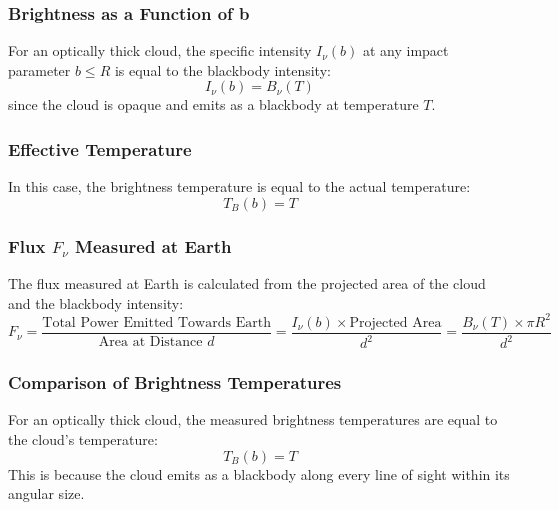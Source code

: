 \documentclass[12pt]{article}
\begin{document}
\subsubsection{Brightness as a Function of b}

For an optically thick cloud, the specific intensity \( I_\nu(b) \) at any impact parameter \( b \leq R \) is equal to the blackbody intensity:
\[
    I_\nu(b) = B_\nu(T)
\]
since the cloud is opaque and emits as a blackbody at temperature \( T \).

\subsubsection{Effective Temperature}

In this case, the brightness temperature is equal to the actual temperature:
\[
    T_B(b) = T
\]

\subsubsection{Flux \( F_\nu \) Measured at Earth}

The flux measured at Earth is calculated from the projected area of the cloud and the blackbody intensity:
\[
    F_\nu = \frac{\text{Total Power Emitted Towards Earth}}{\text{Area at Distance } d} = \frac{I_\nu(b) \times \text{Projected Area}}{d^2} = \frac{B_\nu(T) \times \pi R^2}{d^2}
\]

\subsubsection{Comparison of Brightness Temperatures}

For an optically thick cloud, the measured brightness temperatures are equal to the cloud's temperature:
\[
    T_B(b) = T
\]
This is because the cloud emits as a blackbody along every line of sight within its angular size.

\newpage



\nocite{El-Deeb_PEU-438_Assignments}
\end{document}
